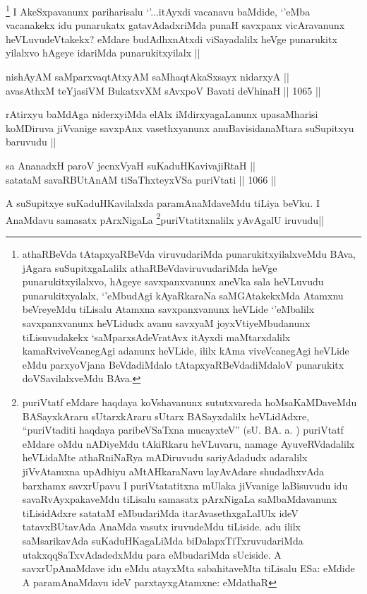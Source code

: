 \begin{artha}
\footnote{athaRBeVda tAtapxyaRBeVda viruvudariMda punarukitxyilalxveMdu BAva, jAgara suSupitxgaLalilx athaRBeVdaviruvudariMda heVge punarukitxyilalxvo, hAgeye savxpanxvanunx aneVka sala heVLuvudu punarukitxyalalx, `\stext'eMbudAgi kAyaRkaraNa saMGAtakekxMda Atamxnu beVreyeMdu tiLisalu Atamxna savxpanxvanunx heVLide `\stext'eMbalilx savxpanxvanunx heVLidudx avanu savxyaM joyxVtiyeMbudanunx tiLisuvudakekx `saMparxsAdeVratAvx itAyxdi maMtarxdalilx kamaRviveVcanegAgi adanunx heVLide, ililx kAma viveVcanegAgi heVLide eMdu parxyoVjana BeVdadiMdalo tAtapxyaRBeVdadiMdaloV punarukitx doVSavilalxveMdu BAva.}
 I AkeSxpavanunx pariharisalu `\stext'...itAyxdi vacanavu baMdide, `\stext'eMba vacanakekx idu punarukatx gatavAdadxriMda punaH savxpanx vicAravanunx heVLuvudeVtakekx? eMdare budAdhxnAtxdi viSayadalilx heVge punarukitx yilalxvo hAgeye idariMda punarukitxyilalx ||
\end{artha}


\begin{shl}
nishAyAM saMparxvaqtAtxyAM saMhaqtAkaSxsayx nidarxyA || \\
avasAthxM teYjasiVM BukatxvXM sAvxpoV Bavati deVhinaH ||  1065 ||  
\end{shl}

\begin{artha}
rAtirxyu baMdAga niderxyiMda elAlx iMdirxyagaLanunx upasaMharisi koMDiruva jiVvanige savxpAnx vasethxyanunx anuBavisidanaMtara suSupitxyu baruvudu ||
\end{artha}

\begin{shl}
sa AnanadxH paroV jecnxVyaH suKaduHKavivajiRtaH || \\
satataM savaRBUtAnAM tiSaThxteyxVSa puriVtati ||  1066 ||  
\end{shl}

\begin{artha}
A suSupitxye suKaduHKavilalxda paramAnaMdaveMdu tiLiya beVku. I AnaMdavu samasatx pArxNigaLa \footnote{puriVtatf eMdare haqdaya koVshavanunx sututxvareda hoMsaKaMDaveMdu BASayxkAraru sUtarxkAraru sUtarx BASayxdalilx heVLidAdxre, ``puriVtaditi haqdaya paribeVSaTxna mucayxteV'' (sU. BA. a. ) puriVtatf eMdare oMdu nADiyeMdu tAkiRkaru heVLuvaru, namage AyuveRVdadalilx heVLidaMte athaRniNaRya mADiruvudu sariyAdadudx adaralilx jiVvAtamxna upAdhiyu aMtAHkaraNavu layAvAdare shudadhxvAda barxhamx savxrUpavu I puriVtatatitxna mUlaka jiVvanige laBisuvudu idu savaRvAyxpakaveMdu tiLisalu samasatx pArxNigaLa saMbaMdavanunx tiLisidAdxre satataM eMbudariMda itarAvasethxgaLalUlx ideV tatavxBUtavAda AnaMda vasutx iruvudeMdu tiLiside. adu ililx saMsarikavAda suKaduHKagaLiMda biDalapxTiTxruvudariMda utakxqqSaTxvAdadedxMdu para eMbudariMda sUciside. A savxrUpAnaMdave idu eMdu atayxMta sabahitaveMta tiLisalu ESa: eMdide A paramAnaMdavu ideV parxtayxgAtamxne: eMdathaR}puriVtatitxnalilx yAvAgalU iruvudu||
\end{artha}


